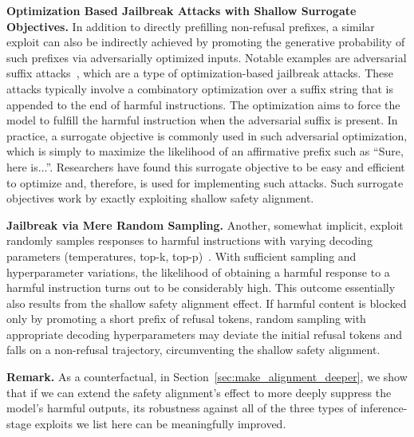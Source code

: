 \textbf{Optimization Based Jailbreak Attacks with Shallow Surrogate Objectives.} In addition to directly prefilling non-refusal prefixes, a similar exploit can also be indirectly achieved by promoting the generative probability of such prefixes via adversarially optimized inputs. Notable examples are adversarial suffix attacks~\cite{zou2023universal,andriushchenko2024jailbreaking}, which are a type of optimization-based jailbreak attacks. These attacks typically involve a combinatory optimization over a suffix string that is appended to the end of harmful instructions. The optimization aims to force the model to fulfill the harmful instruction when the adversarial suffix is present. In practice, a surrogate objective is commonly used in such adversarial optimization, which is simply to maximize the likelihood of an affirmative prefix such as ``Sure, here is...''. Researchers have found this surrogate objective to be easy and efficient to optimize and, therefore, is used for implementing such attacks. Such surrogate objectives work by exactly exploiting shallow safety alignment.
 





\textbf{Jailbreak via Mere Random Sampling.} Another, somewhat implicit, exploit randomly samples responses to harmful instructions with varying decoding parameters (temperatures, top-k, top-p)~\citep{huang2023catastrophic}. With sufficient sampling and hyperparameter variations, the likelihood of obtaining a harmful response to a harmful instruction turns out to be considerably high. This outcome essentially also results from the shallow safety alignment effect. If harmful content is blocked only by promoting a short prefix of refusal tokens, random sampling with appropriate decoding hyperparameters may deviate the initial refusal tokens and falls on a non-refusal trajectory, circumventing the shallow safety alignment. 


\textbf{Remark.} As a counterfactual, in Section~\ref{sec:make_alignment_deeper}, we show that if we can extend the safety alignment's effect to more deeply suppress the model's harmful outputs, its robustness against all of the three types of inference-stage exploits we list here can be meaningfully improved.



